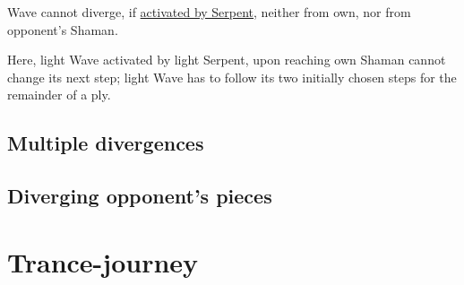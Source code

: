 \vspace*{-0.5\baselineskip}
Wave cannot diverge, if
\hyperref[fig:scn_tr_21_serpent_activating_wave]{activated by Serpent},
neither from own, nor from opponent's Shaman.

Here, light Wave activated by light Serpent, upon reaching own Shaman cannot change
its next step; light Wave has to follow its two initially chosen steps for the
remainder of a ply.

%
%

\clearpage %

\subsection*{Multiple divergences}
\label{sec:Conquest of Tlalocan/Divergence/Multiple divergences}

\TODO

\clearpage %

\subsection*{Diverging opponent's pieces}
\label{sec:Conquest of Tlalocan/Divergence/Diverging opponent's pieces}

\TODO

\clearpage %

\section*{Trance-journey}
\label{sec:Conquest of Tlalocan/Trance-journey}

